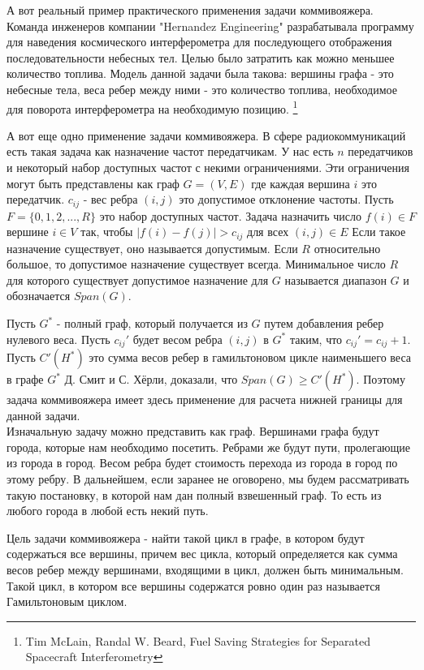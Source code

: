 \documentclass[a4paper, 14pt]{extarticle}
\numberwithin{equation}{section}
\begin{document}
А вот реальный пример практического применения задачи коммивояжера. Команда инженеров компании "Hernandez Engineering"  разрабатывала программу для наведения космического интерферометра для последующего отображения последовательности небесных тел. Целью было затратить как можно меньшее количество топлива. Модель данной задачи была такова: вершины графа - это небесные тела, веса ребер между ними - это количество топлива, необходимое для поворота интерферометра на необходимую позицию. \footnote{Tim McLain, Randal W. Beard, Fuel Saving Strategies for Separated Spacecraft Interferometry}

А вот еще одно применение задачи коммивояжера. В сфере радиокоммуникаций есть такая задача как назначение частот передатчикам. У нас есть $n$ передатчиков и некоторый набор доступных частот с некими ограничениями. Эти ограничения могут быть представлены как граф $G= (V, E)$ где каждая вершина $i$ это передатчик. $c_{ij}$ - вес ребра $(i,j)$ это допустимое отклонение частоты. Пусть $F = \{ 0,1,2,...,R \}$ это набор доступных частот. Задача назначить число $f(i) \in F$ вершине $i \in V$ так, чтобы $|f(i)-f(j)| > c_{ij}$ для всех $(i,j) \in E$ Если такое назначение существует, оно называется допустимым. Если $R$ относительно большое, то допустимое назначение существует всегда. Минимальное число $R$ для которого существует допустимое назначение для $G$ называется диапазон $G$ и обозначается $Span(G)$.

Пусть $G^*$ - полный граф, который получается из $G$ путем добавления ребер нулевого веса. Пусть $c_{ij}'$ будет весом ребра $(i,j)$ в $G^*$ таким, что $c_{ij}' = c_{ij}+1$. Пусть $C'(H^*)$ это сумма весов ребер в гамильтоновом цикле наименьшего веса в графе $G^*$ Д. Смит и С. Хёрли, доказали, что $Span(G) \geq C'(H^*)$. Поэтому задача коммивояжера имеет здесь применение для расчета нижней границы для данной задачи. \\


Изначальную задачу можно представить как граф. Вершинами графа будут города, которые нам необходимо посетить. Ребрами же будут пути, пролегающие из города в город. Весом ребра будет стоимость перехода из города в город по этому ребру. В дальнейшем, если заранее не оговорено, мы будем рассматривать такую постановку, в которой нам дан полный взвешенный граф. То есть из любого города в любой есть некий путь.

Цель задачи коммивояжера - найти такой цикл в графе, в котором будут содержаться все вершины, причем вес цикла, который определяется как сумма весов ребер между вершинами, входящими в цикл, должен быть минимальным. Такой цикл, в котором все вершины содержатся ровно один раз называется Гамильтоновым циклом.
\end{document}
